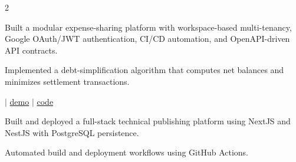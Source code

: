 \documentclass[]{hieudo-build}
\begin{document}
\begin{paracol}{2}
\begin{tightemize}
\item Built a modular expense-sharing platform with workspace-based multi-tenancy, Google OAuth/JWT authentication, CI/CD automation, and OpenAPI-driven API contracts.
\item Implemented a debt-simplification algorithm that computes net balances and minimizes settlement transactions.
\end{tightemize}
\sectionsep 

 $|$ \href{https://www.neuralcook.com}{demo} $|$ \href{https://github.com/Vikramadtya/Blog}{code}

\begin{tightemize}
\item Built and deployed a full-stack technical publishing platform using NextJS and NestJS with PostgreSQL persistence.
\item Automated build and deployment workflows using GitHub Actions.
\end{tightemize}
\sectionsep 

\end{paracol}
\end{document}

